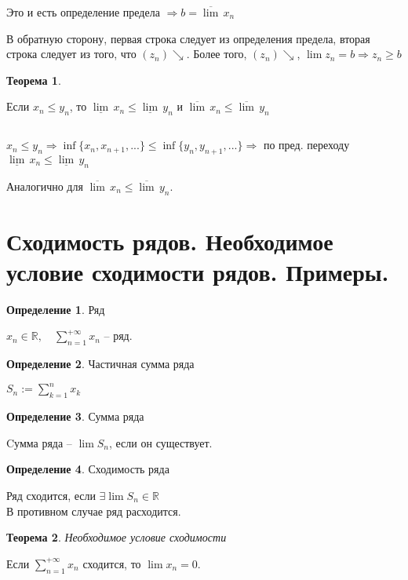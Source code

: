 \documentclass[12pt,letterpaper]{report}
\makeatletter
\newtheorem{theorem}{Теорема}
\theoremstyle{definition}
\newtheorem*{conj}{Определение}
\renewenvironment{proof}[1][\proofname]{%
   \par\pushQED{\qed}\normalfont%
   \topsep6\p@\@plus6\p@\relax
   \trivlist\item[\hskip\labelsep\bfseries#1\@addpunct{.}]%
   \ignorespaces
}{%
   \popQED\endtrivlist\@endpefalse
}
\makeatother
\begin{document}
\begin{proof}
        Это и есть определение предела $\Rightarrow b = 
        \overline{\lim}\, x_n$
    
        В обратную сторону, первая строка следует из определения предела,
        вторая строка следует из того, что $(z_n) \searrow$. Более того,
        $(z_n) \searrow$, $\lim z_n = b \Rightarrow z_n \geq b$
    
    \end{proof}
    
    \begin{theorem}\end{theorem}
    Если $x_n \leq y_n$, то 
    $\underline{\lim}\, x_n \leq \underline{\lim}\, y_n$ и  
    $\overline{\lim}\, x_n \leq \overline{\lim}\, y_n$
    
    \begin{proof} $ $
    
    $x_n \leq y_n \Rightarrow \inf\{x_n, x_{n + 1}, ...\} \leq
    \inf\{y_n, y_{n + 1}, ...\} \Rightarrow$ по пред. переходу 
    $\underline{\lim}\, x_n \leq \underline{\lim}\, y_n$
    
    Аналогично для $\overline{\lim}\, x_n \leq \overline{\lim}\, y_n$.
    \end{proof}
    
    \section{Сходимость рядов. Необходимое условие сходимости рядов. Примеры.}
    
    \begin{conj}Ряд\end{conj}
    $x_n \in \mathbb{R}, \quad \sum_{n=1}^{+\infty} x_n$ -- ряд.
    
    \begin{conj}Частичная сумма ряда\end{conj}
    $S_n := \sum_{k=1}^{n} x_k$
    
    \begin{conj}Сумма ряда\end{conj}
    Cумма ряда -- $\lim S_n$, если он существует.
    
    \begin{conj}Сходимость ряда\end{conj}
    Ряд сходится, если $\exists \lim S_n \in \mathbb{R}$\\
    В противном случае ряд расходится.
    
    \begin{theorem}
    Необходимое условие сходимости
    \end{theorem}
    Если $\sum_{n = 1}^{+\infty} x_n$ сходится, то $\lim x_n = 0$.
    
\end{document}
